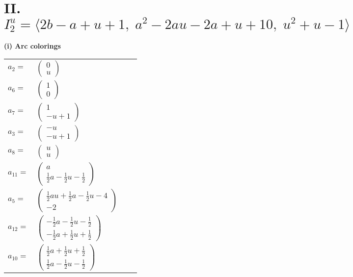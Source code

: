 \documentclass[1p]{elsarticle_modified}
\theoremstyle{definition}
\begin{document}
\centering \section*{II. $I^u_{2}= \langle 2 b- a+u+1,\;a^2-2 a u-2 a+u+10,\;u^2+u-1 \rangle$}
\flushleft \textbf{(i) Arc colorings}\\
\begin{tabular}{m{7pt} m{180pt} m{7pt} m{180pt} }
\flushright $a_{2}=$&$\begin{pmatrix}0\\u\end{pmatrix}$ \\
\flushright $a_{6}=$&$\begin{pmatrix}1\\0\end{pmatrix}$ \\
\flushright $a_{7}=$&$\begin{pmatrix}1\\- u+1\end{pmatrix}$ \\
\flushright $a_{3}=$&$\begin{pmatrix}- u\\- u+1\end{pmatrix}$ \\
\flushright $a_{8}=$&$\begin{pmatrix}u\\u\end{pmatrix}$ \\
\flushright $a_{11}=$&$\begin{pmatrix}a\\\frac{1}{2} a-\frac{1}{2} u-\frac{1}{2}\end{pmatrix}$ \\
\flushright $a_{5}=$&$\begin{pmatrix}\frac{1}{2} a u+\frac{1}{2} a-\frac{1}{2} u-4\\-2\end{pmatrix}$ \\
\flushright $a_{12}=$&$\begin{pmatrix}-\frac{1}{2} a-\frac{1}{2} u-\frac{1}{2}\\-\frac{1}{2} a+\frac{1}{2} u+\frac{1}{2}\end{pmatrix}$ \\
\flushright $a_{10}=$&$\begin{pmatrix}\frac{1}{2} a+\frac{1}{2} u+\frac{1}{2}\\\frac{1}{2} a-\frac{1}{2} u-\frac{1}{2}\end{pmatrix}$ \\

\end{tabular}
\end{document}
